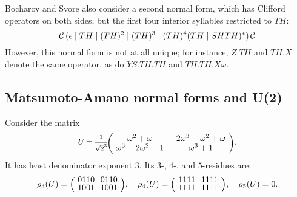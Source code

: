Bocharov and Svore {\cite[Prop.2]{BS}} also consider a second normal form, which has Clifford
operators on both sides, but the first four interior syllables restricted to $TH$:
\begin{equation}
  {\mathcal C}\,(\epsilon\mid TH\mid (TH)^2 \mid (TH)^3 \mid (TH)^4(TH\mid SHTH)^*)\,{\mathcal C}
\end{equation}
However, this normal form is not at all unique; for instance, $Z.TH$ and $TH.X$ denote the same
operator, as do $YS.TH.TH$ and $TH.TH.X\omega$.


\subsection{Matsumoto-Amano normal forms and U(2)} %
\label{sub:matsumoto_amano_normal_forms_and_u_2_}

\begin{example}\label{exa-k-residue-for-single}
  Consider the matrix
  \[ U \,{=}\, \frac{\scriptstyle 1}{\scriptstyle \sqrt{2}^3}\!\scriptscriptstyle\zmatrix{cc}{
    \omega^2+\omega         & -2\omega^3+\omega^2+\omega \\
     \omega^3 -2\omega^2-1  & -\omega^3+1
    }.
  \]
  It has least denominator exponent $3$. Its $3$-, $4$-, and
  $5$-residues are:
  \begin{equation*}
    \rho_3(U) = \zmatrix{cc}{
      0110 & 0110\\
      1001 & 1001
    },\quad
    \rho_4(U) = \zmatrix{cc}{
      1111 & 1111\\
      1111 & 1111
    },\quad
    \rho_5(U) = 0.
  \end{equation*}
\end{example}

